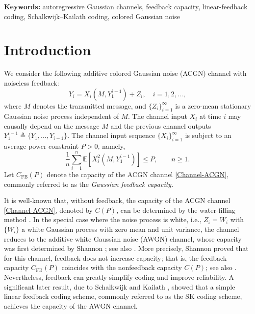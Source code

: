 \documentclass[12pt]{article}
\newcommand{\E}{\mathbb{E}}
\newenvironment{keywords}
  {\par\noindent\textbf{Keywords: }}
  {\par}
\begin{document}
\begin{keywords}
autoregressive Gaussian channels, feedback capacity, linear-feedback coding, Schalkwijk--Kailath coding, colored Gaussian noise
\end{keywords}

\section{Introduction} \label{sec:introduction}
We consider the following additive colored Gaussian noise (ACGN) channel with noiseless feedback:
\begin{equation}\label{Channel-ACGN}
   Y_i = X_i(M,Y_1^{i-1}) + Z_i,\quad i=1,2,\dots,
\end{equation}
where $M$ denotes the transmitted message, and $\{Z_i\}_{i=1}^\infty$ is a zero-mean stationary Gaussian noise process independent of $M$. The channel input $X_i$ at time $i$ may causally depend on the message $M$ and the previous channel outputs $Y_1^{i-1}\triangleq\{Y_1,\ldots,Y_{i-1}  \}$. The channel input sequence $\{X_i\}_{i=1}^\infty$ is subject to an average power constraint $P>0$, namely,
$$
   \frac{1}{n}\sum_{i=1}^n\E[X^2_i(M,Y_1^{i-1})] \le P ,\qquad n\ge1.
$$
Let $C_{\mathrm{FB}}(P)$ denote the capacity of the ACGN channel \eqref{Channel-ACGN}, commonly referred to as the {\em Gaussian feedback capacity}.

It is well-known that, without feedback, the capacity of the ACGN channel \eqref{Channel-ACGN}, denoted by $C(P)$, can be determined by the water-filling method \cite{Shannon1949}. In the special case where the noise process is white, i.e., $Z_i=W_i$ with $\{W_i\}$ a white Gaussian process with zero mean and unit variance, the channel reduces to the additive white Gaussian noise (AWGN) channel, whose capacity was first determined by Shannon \cite{shannon1948mathematical,Shannon1949}; see also \cite{wolfowitz1964,wolfowitz1968note}. More precisely, Shannon \cite{shannon1956zero} proved that for this channel, feedback does not increase capacity; that is, the feedback capacity $C_{\mathrm{FB}}(P)$ coincides with the nonfeedback capacity $C(P)$; see also \cite{kadota1971capacity,kadota1971mutual}. Nevertheless, feedback can greatly simplify coding and improve reliability. A significant later result, due to Schalkwijk and Kailath \cite{schalkwijk1966coding2, schalkwijk1966coding}, showed that a simple linear feedback coding scheme, commonly referred to as the SK coding scheme, achieves the capacity of the AWGN channel.
\end{document}
